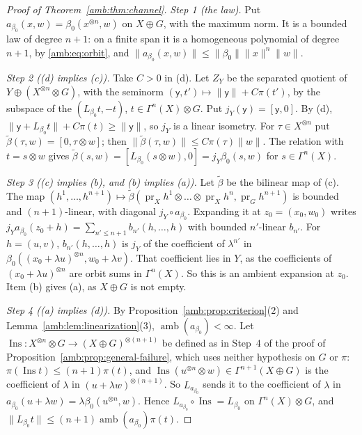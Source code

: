 \documentclass[11pt]{amsart}
\theoremstyle{definition}
\theoremstyle{remark}
\numberwithin{equation}{section}
\newcommand{\norm}[1]{\lVert #1\rVert}
\theoremstyle{plain}
\theoremstyle{definition}
\theoremstyle{plain}
\begin{document}
\begin{proof}[Proof of Theorem~\ref{amb:thm:channel}]
\emph{Step 1 (the law).} Put $a_{\beta_0}(x,w)=\beta_0(x^{\otimes n},w)$ on $X\oplus G$, with the maximum norm. It is a bounded law of degree $n+1$: on a finite span it is a homogeneous polynomial of degree $n+1$, by \eqref{amb:eq:orbit}, and $\norm{a_{\beta_0}(x,w)}\le\norm{\beta_0}\norm x^n\norm w$.

\emph{Step 2 ((d) implies (c)).} Take $C>0$ in (d). Let $Z_Y$ be the separated quotient of $Y\oplus(X^{\otimes n}\otimes G)$, with the seminorm $(\mathsf y,t')\mapsto\norm{\mathsf y}+C\pi(t')$, by the subspace of the $(L_{\beta_0}t,-t)$, $t\in\Gamma^n(X)\otimes G$. Put $j_Y(\mathsf y)=[\mathsf y,0]$. By (d), $\norm{\mathsf y+L_{\beta_0}t}+C\pi(t)\ge\norm{\mathsf y}$, so $j_Y$ is a linear isometry. For $\tau\in X^{\otimes n}$ put $\tilde\beta(\tau,w)=[0,\tau\otimes w]$; then $\norm{\tilde\beta(\tau,w)}\le C\pi(\tau)\norm w$. The relation with $t=s\otimes w$ gives $\tilde\beta(s,w)=[L_{\beta_0}(s\otimes w),0]=j_Y\beta_0(s,w)$ for $s\in\Gamma^n(X)$.

\emph{Step 3 ((c) implies (b), and (b) implies (a)).} Let $\tilde\beta$ be the bilinear map of (c). The map $(h^1,\dots,h^{n+1})\mapsto\tilde\beta(\operatorname{pr}_Xh^1\otimes\dots\otimes\operatorname{pr}_Xh^n,\operatorname{pr}_Gh^{n+1})$ is bounded and $(n+1)$-linear, with diagonal $j_Y\circ a_{\beta_0}$. Expanding it at $z_0=(x_0,w_0)$ writes $j_Ya_{\beta_0}(z_0+h)=\sum_{n'\le n+1}b_{n'}(h,\dots,h)$ with bounded $n'$-linear $b_{n'}$. For $h=(u,v)$, $b_{n'}(h,\dots,h)$ is $j_Y$ of the coefficient of $\lambda^{n'}$ in $\beta_0((x_0+\lambda u)^{\otimes n},w_0+\lambda v)$. That coefficient lies in $Y$, as the coefficients of $(x_0+\lambda u)^{\otimes n}$ are orbit sums in $\Gamma^n(X)$. So this is an ambient expansion at $z_0$. Item (b) gives (a), as $X\oplus G$ is not empty.

\emph{Step 4 ((a) implies (d)).} By Proposition~\ref{amb:prop:criterion}(2) and Lemma~\ref{amb:lem:linearization}(3), $\operatorname{amb}(a_{\beta_0})<\infty$. Let $\operatorname{Ins}\colon X^{\otimes n}\otimes G\to(X\oplus G)^{\otimes(n+1)}$ be defined as in Step~4 of the proof of Proposition~\ref{amb:prop:general-failure}, which uses neither hypothesis on $G$ or $\pi$: $\pi(\operatorname{Ins}t)\le(n+1)\pi(t)$, and $\operatorname{Ins}(u^{\otimes n}\otimes w)\in\Gamma^{n+1}(X\oplus G)$ is the coefficient of $\lambda$ in $(u+\lambda w)^{\otimes(n+1)}$. So $L_{a_{\beta_0}}$ sends it to the coefficient of $\lambda$ in $a_{\beta_0}(u+\lambda w)=\lambda\beta_0(u^{\otimes n},w)$. Hence $L_{a_{\beta_0}}\circ\operatorname{Ins}=L_{\beta_0}$ on $\Gamma^n(X)\otimes G$, and $\norm{L_{\beta_0}t}\le(n+1)\operatorname{amb}(a_{\beta_0})\pi(t)$.


\end{proof}
\end{document}
